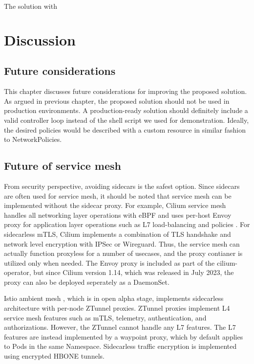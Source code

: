 \documentclass[english, 12pt, a4paper, sci, utf8, a-2b, online]{aaltothesis}
\begin{document}
The solution with

\clearpage

\section{Discussion} \label{sec:discussion}

\subsection{Future considerations}

This chapter discusses future considerations for improving the proposed solution.
As argued in previous chapter, the proposed solution should not be used in production environments.
A production-ready solution should definitely include a valid controller loop instead of the shell script we used for demonstration.
Ideally, the desired policies would be described with a custom resource in similar fashion to NetworkPolicies.




\subsection{Future of service mesh}

From security perspective, avoiding sidecars is the safest option.
Since sidecars are often used for service mesh, it should be noted that service mesh can be implemented without the sidecar proxy.
For example, Cilium service mesh handles all networking layer operations with eBPF and uses per-host Envoy proxy for application layer operations such as L7 load-balancing and policies \cite{cilium-114}.
For sidecarless mTLS, Cilium implements a combination of TLS handshake and network level encryption with IPSec or Wireguard.
Thus, the service mesh can actually function proxyless for a number of usecases, and the proxy contianer is utilized only when needed.
The Envoy proxy is included as part of the cilium-operator, but since Cilium version 1.14, which was released in July 2023, the proxy can also be deployed seperately as a DaemonSet.

Istio ambient mesh \cite{istio-ambient-mesh}, which is in open alpha stage, implements sidecarless architecture with per-node ZTunnel proxies.
ZTunnel proxies implement L4 service mesh features such as mTLS, telemetry, authentication, and authorizations.
However, the ZTunnel cannot handle any L7 features.
The L7 features are instead implemented by a waypoint proxy, which by default applies to Pods in the same Namespace.
Sidecarless traffic encryption is implemented using encrypted HBONE tunnels.
\end{document}
